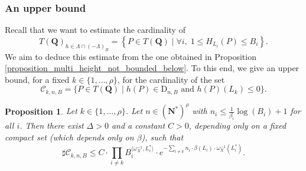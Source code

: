 \documentclass{proc-l}
\newcommand{\N}{\mathbf{N}}
\newcommand{\Q}{\mathbf{Q}}
\newcommand{\w}{\omega}
\newtheorem{prop}[theorem]{Proposition}
\theoremstyle{definition}
\theoremstyle{remark}
\numberwithin{equation}{section}
\begin{document}
\subsubsection{An upper bound}




Recall that we want to estimate the cardinality of
\[
T(\Q)_{h \in \Lambda \cap (-\Lambda)_B}
= \left\{ P \in T(\Q) \mid \forall i,\; 1 \leqslant H_{L_i}(P) \leqslant B_i \right\}.
\]
We aim to deduce this estimate from the one obtained in Proposition \ref{proposition_multi_height_not_bounded_below}. To this end, we give an upper bound, for a fixed \(k \in \{1,\ldots,\rho\}\), for the cardinality of the set
\[
\mathcal{C}_{k,n,B}
= \{ P \in T(\Q) \mid h(P) \in \mathrm{D}_{n,B} \text{ and } h(P)(L_k) \leqslant 0 \}.
\]

\begin{prop}\label{proposition_majoration_cardinal_boite_compact}
Let \(k \in \{1,\ldots,\rho\}\). Let $n \in (\N^*)^{\rho}$ with $n_i \leqslant \frac{1}{\beta_i}\log(B_i)+1$ for all $i$. Then there exist $\Delta > 0$ and a constant \(C > 0\), depending only on a fixed compact set (which depends only on $\beta$), such that
\[
\sharp \mathcal{C}_{k,n,B}
\leqslant
C \cdot \prod_{i \neq k} B_i^{\langle \w_{X}^{-1}, L_i^{*} \rangle}
\cdot e^{- \sum\limits_{i \neq k} n_i \cdot \beta(L_i) \cdot \w_{X}^{-1}(L_i^*) }.
\]
\end{prop}
\end{document}
